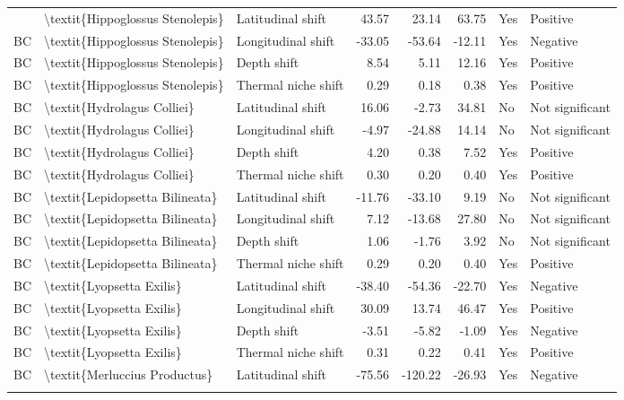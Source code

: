 \begin{longtable}[t]{lllrrrll}
{{BC & \textbackslash{}textit\{Hippoglossus Stenolepis\} & Latitudinal shift & 43.57 & 23.14 & 63.75 & Yes & Positive\\
BC & \textbackslash{}textit\{Hippoglossus Stenolepis\} & Longitudinal shift & -33.05 & -53.64 & -12.11 & Yes & Negative\\
\addlinespace
BC & \textbackslash{}textit\{Hippoglossus Stenolepis\} & Depth shift & 8.54 & 5.11 & 12.16 & Yes & Positive\\
BC & \textbackslash{}textit\{Hippoglossus Stenolepis\} & Thermal niche shift & 0.29 & 0.18 & 0.38 & Yes & Positive\\
BC & \textbackslash{}textit\{Hydrolagus Colliei\} & Latitudinal shift & 16.06 & -2.73 & 34.81 & No & Not significant\\
BC & \textbackslash{}textit\{Hydrolagus Colliei\} & Longitudinal shift & -4.97 & -24.88 & 14.14 & No & Not significant\\
BC & \textbackslash{}textit\{Hydrolagus Colliei\} & Depth shift & 4.20 & 0.38 & 7.52 & Yes & Positive\\
\addlinespace
BC & \textbackslash{}textit\{Hydrolagus Colliei\} & Thermal niche shift & 0.30 & 0.20 & 0.40 & Yes & Positive\\
BC & \textbackslash{}textit\{Lepidopsetta Bilineata\} & Latitudinal shift & -11.76 & -33.10 & 9.19 & No & Not significant\\
BC & \textbackslash{}textit\{Lepidopsetta Bilineata\} & Longitudinal shift & 7.12 & -13.68 & 27.80 & No & Not significant\\
BC & \textbackslash{}textit\{Lepidopsetta Bilineata\} & Depth shift & 1.06 & -1.76 & 3.92 & No & Not significant\\
BC & \textbackslash{}textit\{Lepidopsetta Bilineata\} & Thermal niche shift & 0.29 & 0.20 & 0.40 & Yes & Positive\\
\addlinespace
BC & \textbackslash{}textit\{Lyopsetta Exilis\} & Latitudinal shift & -38.40 & -54.36 & -22.70 & Yes & Negative\\
BC & \textbackslash{}textit\{Lyopsetta Exilis\} & Longitudinal shift & 30.09 & 13.74 & 46.47 & Yes & Positive\\
BC & \textbackslash{}textit\{Lyopsetta Exilis\} & Depth shift & -3.51 & -5.82 & -1.09 & Yes & Negative\\
BC & \textbackslash{}textit\{Lyopsetta Exilis\} & Thermal niche shift & 0.31 & 0.22 & 0.41 & Yes & Positive\\
BC & \textbackslash{}textit\{Merluccius Productus\} & Latitudinal shift & -75.56 & -120.22 & -26.93 & Yes & Negative\\
}}
\end{longtable}
